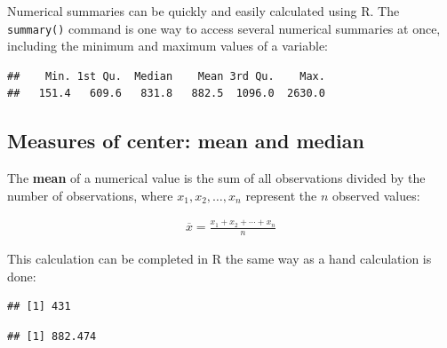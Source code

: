 Numerical summaries can be quickly and easily calculated using \textsf{R}. The \texttt{summary()} command is one way to access several numerical summaries at once, including the minimum and maximum values of a variable:
\begin{knitrout}
\color{fgcolor}\begin{kframe}
\begin{alltt}
\hlopt{$}
\end{alltt}
\begin{verbatim}
##    Min. 1st Qu.  Median    Mean 3rd Qu.    Max. 
##   151.4   609.6   831.8   882.5  1096.0  2630.0
\end{verbatim}
\end{kframe}
\end{knitrout}

\subsection{Measures of center: mean and median}

The \textbf{mean} of a numerical value is the sum of all observations divided by the number of observations, where $x_1, x_2, \dots, x_n$ represent the $n$ observed values:

\begin{align*}
		\overline{x} = \frac{x_1+x_2+\cdots+x_n}{n}
\end{align*}

This calculation can be completed in \textsf{R} the same way as a hand calculation is done:
\begin{knitrout}
\color{fgcolor}\begin{kframe}
\begin{alltt}
 \hlkwb{=} \hlopt{$}
\end{alltt}
\begin{verbatim}
## [1] 431
\end{verbatim}
\begin{alltt}
\hlopt{$}\hlopt{/}
\end{alltt}
\begin{verbatim}
## [1] 882.474
\end{verbatim}
\end{kframe}
\end{knitrout}


